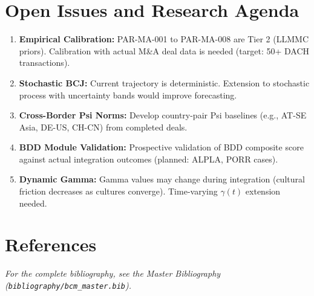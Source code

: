 \section{Open Issues and Research Agenda}
\label{sec:ma-open}

\begin{enumerate}
\item \textbf{Empirical Calibration:} PAR-MA-001 to PAR-MA-008 are Tier 2
      (LLMMC priors). Calibration with actual M\&A deal data is needed
      (target: 50+ DACH transactions).
\item \textbf{Stochastic BCJ:} Current trajectory is deterministic. Extension
      to stochastic process with uncertainty bands would improve forecasting.
\item \textbf{Cross-Border Psi Norms:} Develop country-pair Psi baselines
      (e.g., AT-SE Asia, DE-US, CH-CN) from completed deals.
\item \textbf{BDD Module Validation:} Prospective validation of BDD composite
      score against actual integration outcomes (planned: ALPLA, PORR cases).
\item \textbf{Dynamic Gamma:} Gamma values may change during integration
      (cultural friction decreases as cultures converge). Time-varying
      $\gamma(t)$ extension needed.
\end{enumerate}


\section{References}
\label{sec:ma-references}

\nocite{bcm_master}


\vspace{1em}
\noindent\textit{For the complete bibliography, see the Master Bibliography
(\texttt{bibliography/bcm\_master.bib}).}


